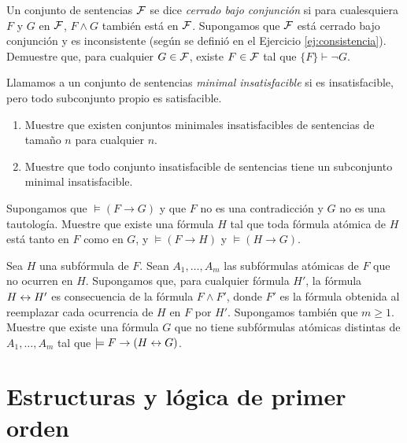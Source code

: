 \message{ !name(main.tex)}\documentclass[12pt,a4paper]{book}
\begin{document}
    \begin{ejercicio}
        Un conjunto de sentencias $\mathcal{F}$ se dice \textit{cerrado bajo conjunción} si para cualesquiera $F$ y $G$ en $\mathcal{F}$,
        $F\wedge G$ también está en $\mathcal{F}$. Supongamos que $\mathcal{F}$ está cerrado bajo conjunción y es inconsistente (según se
        definió en el Ejercicio \ref{ej:consistencia}). Demuestre que, para cualquier $G\in\mathcal{F}$, existe $F\in\mathcal{F}$ tal que
        $\{F\}\vdash\neg G$.
    \end{ejercicio}

    \begin{ejercicio}
        Llamamos a un conjunto de sentencias \textit{minimal insatisfacible} si es insatisfacible, pero todo subconjunto
        propio es satisfacible.
        \begin{enumerate}[label=(\alph*)]
            \item Muestre que existen conjuntos minimales insatisfacibles de sentencias de tamaño $n$ para cualquier $n$.
            \item Muestre que todo conjunto insatisfacible de sentencias tiene un subconjunto minimal insatisfacible.
        \end{enumerate}
    \end{ejercicio}

    \begin{ejercicio}
        Supongamos que $\models(F\rightarrow G)$ y que $F$ no es una contradicción y $G$ no es una tautología. Muestre que
        existe una fórmula $H$ tal que toda fórmula atómica de $H$ está tanto en $F$ como en $G$, y $\models(F\rightarrow H)$
        y $\models(H\rightarrow G)$.
    \end{ejercicio}

    \begin{ejercicio}
        Sea $H$ una subfórmula de $F$. Sean $A_{1},\dots,A_{m}$ las subfórmulas atómicas de $F$ que no ocurren en $H$.
        Supongamos que, para cualquier fórmula $H'$, la fórmula $H\leftrightarrow H'$ es consecuencia de la fórmula $F\wedge F'$, donde
        $F'$ es la fórmula obtenida al reemplazar cada ocurrencia de $H$ en $F$ por $H'$. Supongamos también que $m\geq 1$.
        Muestre que existe una fórmula $G$ que no tiene subfórmulas atómicas distintas de $A_{1},\dots,A_{m}$ tal que
        $\models F\rightarrow(H\leftrightarrow G)$.
    \end{ejercicio}

    \chapter{Estructuras y lógica de primer orden}
\end{document}
